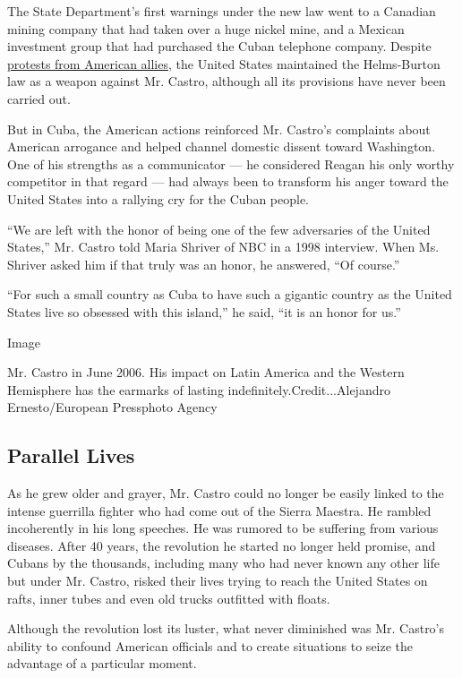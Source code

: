 The State Department's first warnings under the new law went to a
Canadian mining company that had taken over a huge nickel mine, and a
Mexican investment group that had purchased the Cuban telephone company.
Despite
\href{http://www.nytimes.com/1996/06/13/world/canada-and-mexico-join-to-oppose-us-law-on-cuba.html}{protests
from American allies}, the United States maintained the Helms-Burton law
as a weapon against Mr. Castro, although all its provisions have never
been carried out.

But in Cuba, the American actions reinforced Mr. Castro's complaints
about American arrogance and helped channel domestic dissent toward
Washington. One of his strengths as a communicator --- he considered
Reagan his only worthy competitor in that regard --- had always been to
transform his anger toward the United States into a rallying cry for the
Cuban people.

``We are left with the honor of being one of the few adversaries of the
United States,'' Mr. Castro told Maria Shriver of NBC in a 1998
interview. When Ms. Shriver asked him if that truly was an honor, he
answered, ``Of course.''

``For such a small country as Cuba to have such a gigantic country as
the United States live so obsessed with this island,'' he said, ``it is
an honor for us.''

Image

Mr. Castro in June 2006. His impact on Latin America and the Western
Hemisphere has the earmarks of lasting indefinitely.Credit...Alejandro
Ernesto/European Pressphoto Agency

\hypertarget{parallel-lives}{%
\subsection{Parallel Lives}\label{parallel-lives}}

As he grew older and grayer, Mr. Castro could no longer be easily linked
to the intense guerrilla fighter who had come out of the Sierra Maestra.
He rambled incoherently in his long speeches. He was rumored to be
suffering from various diseases. After 40 years, the revolution he
started no longer held promise, and Cubans by the thousands, including
many who had never known any other life but under Mr. Castro, risked
their lives trying to reach the United States on rafts, inner tubes and
even old trucks outfitted with floats.

Although the revolution lost its luster, what never diminished was Mr.
Castro's ability to confound American officials and to create situations
to seize the advantage of a particular moment.

